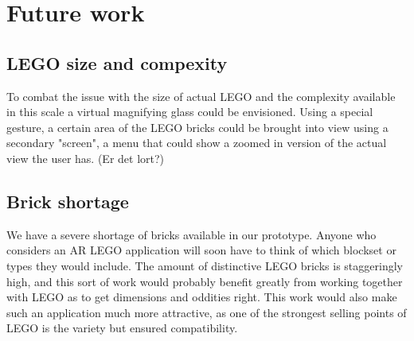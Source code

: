 
\section{Future work}
\subsection{LEGO size and compexity}
To combat the issue with the size of actual LEGO and the complexity available in this scale a virtual magnifying glass could be envisioned. Using a special gesture, a certain area of the LEGO bricks could be brought into view using a secondary "screen", a menu that could show a zoomed in version of the actual view the user has. (Er det lort?)


\subsection{Brick shortage}
We have a severe shortage of bricks available in our prototype. Anyone who considers an AR LEGO application will soon have to think of which blockset or types they would include. The amount of distinctive LEGO bricks is staggeringly high, and this sort of work would probably benefit greatly from working together with LEGO as to get dimensions and oddities right. This work would also make such an application much more attractive, as one of the strongest selling points of LEGO is the variety but ensured compatibility. 

